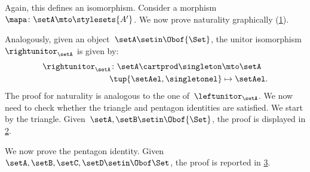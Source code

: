 \begin{example}
    Again, this defines an isomorphism.
    Consider a morphism~$\mapa\colon \setA\mto \stylesets{A'}$.
    We now prove naturality graphically (\cref{fig:monoidal_set_unit_nat}).

    \begin{figure}[h!]
        \centering
        \caption{}
        \label{fig:monoidal_set_unit_nat}
    \end{figure}

    Analogously, given an object~$\setA\setin \Obof{\Set}$, the unitor isomorphism~$\rightunitor_\setA$ is given by:
    \begin{equation}
        \label{eq:set_mon_prod_5}
        \begin{aligned}
            \rightunitor_\setA\colon \setA\cartprod \singleton & \mto \setA \\
            \tup{\setAel,\singletonel}                         & \mapsto \setAel.
        \end{aligned}
    \end{equation}
    The proof for naturality is analogous to the one of~$\leftunitor_\setA$.
    We now need to check whether the triangle and pentagon identities are satisfied.
    We start by the triangle.
    Given~$\setA,\setB\setin \Obof{\Set}$, the proof is displayed in \cref{fig:set_mon_triangle}.

    \begin{figure}[h]
        \centering
        \caption{}
        \label{fig:set_mon_triangle}
    \end{figure}

    We now prove the pentagon identity.
    Given~$\setA,\setB,\setC,\setD\setin \Obof\Set$, the proof is reported in \cref{fig:set_mon_pent}.

    \begin{figure}[h]
        \centering
        \caption{}
        \label{fig:set_mon_pent}
    \end{figure}
\end{example}



